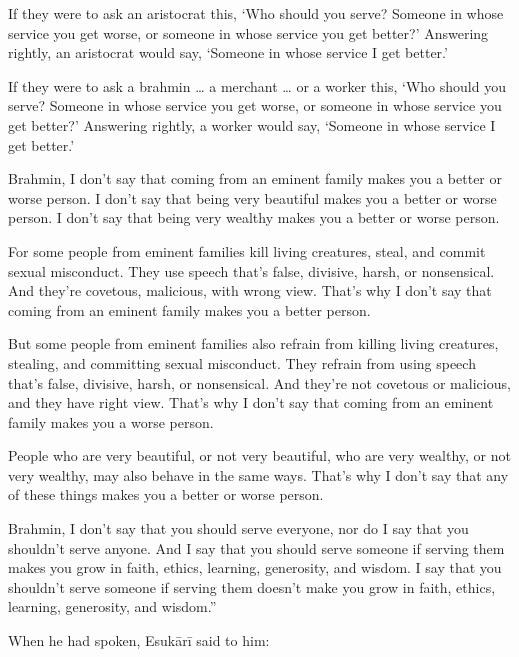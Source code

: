 \documentclass[12pt,openany]{book}%
\begin{document}
If they were to ask an aristocrat this, ‘Who should you serve? Someone in whose service you get worse, or someone in whose service you get better?’ Answering rightly, an aristocrat would say, ‘Someone in whose service I get better.’ 

If they were to ask a brahmin … a merchant … or a worker this, ‘Who should you serve? Someone in whose service you get worse, or someone in whose service you get better?’ Answering rightly, a worker would say, ‘Someone in whose service I get better.’ 

Brahmin, I don’t say that coming from an eminent family makes you a better or worse person. I don’t say that being very beautiful makes you a better or worse person. I don’t say that being very wealthy makes you a better or worse person. 

For some people from eminent families kill living creatures, steal, and commit sexual misconduct. They use speech that’s false, divisive, harsh, or nonsensical. And they’re covetous, malicious, with wrong view. That’s why I don’t say that coming from an eminent family makes you a better person. 

But some people from eminent families also refrain from killing living creatures, stealing, and committing sexual misconduct. They refrain from using speech that’s false, divisive, harsh, or nonsensical. And they’re not covetous or malicious, and they have right view. That’s why I don’t say that coming from an eminent family makes you a worse person. 

People who are very beautiful, or not very beautiful, who are very wealthy, or not very wealthy, may also behave in the same ways. That’s why I don’t say that any of these things makes you a better or worse person. 

Brahmin, I don’t say that you should serve everyone, nor do I say that you shouldn’t serve anyone. And I say that you should serve someone if serving them makes you grow in faith, ethics, learning, generosity, and wisdom. I say that you shouldn’t serve someone if serving them doesn’t make you grow in faith, ethics, learning, generosity, and wisdom.” 

When he had spoken, \textsanskrit{Esukārī} said to him: 
\end{document}
